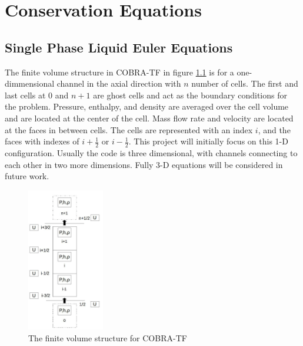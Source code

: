 \vspace*{-80mm}
\chapter{Conservation Equations} \label{chapter2:conservation_equations}
	
	
\section{Single Phase Liquid Euler Equations} \label{sec:euler_equations}
	
	The finite volume structure in COBRA-TF in figure \ref{fig:CTF-Cells} is for
	a one-dimmensional channel in the axial direction with $n$ number of cells.
	The first and last cells at $0$ and $n+1$ are ghost cells and act as the
	boundary conditions for the problem. Pressure, enthalpy, and density are
	averaged over the cell volume and are located at the center of the cell.
	Mass flow rate and velocity are located at the faces in between cells. The
	cells are represented with an index $i$, and the faces with indexes of
	$i+\frac{1}{2}$ or $i-\frac{1}{2}$. This project will initially focus
	on this 1-D configuration. Usually the code is three dimensional, with
	channels connecting to each other in two more dimensions. Fully 3-D
	equations will be considered in future work.
	
	\begin{figure}[!h]
		\centering
		\includegraphics[width=0.30\textwidth]{images/CTF-Cells}
		\caption{The finite volume structure for COBRA-TF}
		\label{fig:CTF-Cells}
	\end{figure}

